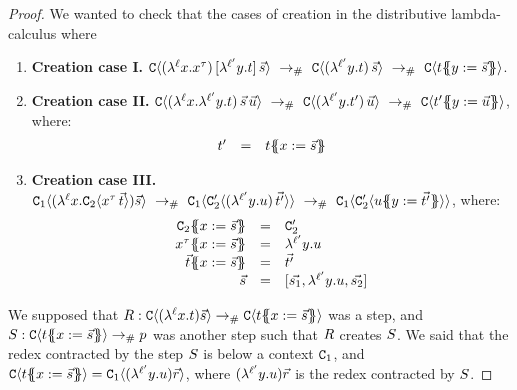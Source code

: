 
\begin{proof}
We wanted to check that the cases of creation in the distributive lambda-calculus where
\begin{enumerate}
\item {\bf Creation case I.}
  $
    \con\of{ (\lamp{\lab}{\var}{\var^{\typ}})\,[\lamp{\labtwo}{\vartwo}{\tm}]\, \ls{\tmtwo}}
    \ \todist\ %
    \con\of{ (\lamp{\labtwo}{\vartwo}{\tm})\,\ls{\tmtwo} }
    \ \todist\ %
    \con\of{ \tm\sub{\vartwo}{\ls{\tmtwo}} }
  $.
\item {\bf Creation case II.}
  $
     \con\of{ (\lamp{\lab}{\var}{ \lamp{\labtwo}{\vartwo}{\tm} })\,\ls{\tmtwo}\,\ls{\tmthree} }
     \ \todist\ %
     \con\of{ (\lamp{\labtwo}{\vartwo}{\tm'})\,\ls{\tmthree} }
     \ \todist\ %
     \con\of{ \tm'\sub{\vartwo}{\ls{\tmthree}} }
  $, where:
  \[
     \begin{array}{rcl}
     t' & = & t\{\!\!\{x := \vec{s}\}\!\!\}
     \end{array}
  \]
\item {\bf Creation case III.}
  $
    \con_1\of{(\lamp{\lab}{\var}{\con_2\of{\var^{\typ}\,\ls{\tm}}})\ls{\tmtwo}}
    \ \todist\ %
    \con_1\of{\con'_2\of{(\lamp{\labtwo}{\vartwo}{\tmthree})\,\ls{\tm'}}}
    \ \todist\ %
    \con_1\of{\con'_2\of{\tmthree\sub{\vartwo}{\ls{\tm'}}}}
  $,
  where:
  \[
  \begin{array}{rcl}
    \con_2\sub{\var}{\ls{\tmtwo}}      & = & \con'_2 \\
    \var^{\typ}\sub{\var}{\ls{\tmtwo}} & = & \lamp{\labtwo}{\vartwo}{\tmthree} \\
    \ls{\tm}\sub{\var}{\ls{\tmtwo}}    & = & \ls{\tm'} \\
    \ls{\tmtwo}                        & = & [\ls{\tmtwo_1},\lamp{\labtwo}{\vartwo}{\tmthree},\ls{\tmtwo_2}] \\
  \end{array}
  \]
\end{enumerate}

We supposed that $R : \mathtt{C}\langle(\lambda^{\ell} x. t)\vec{s}\rangle \mathrel{\to_{\mathtt{\#}}} \mathtt{C}\langle t\{\!\!\{x := \vec{s}\}\!\!\}\rangle$ was a step,
and $S : \mathtt{C}\langle t\{\!\!\{x := \vec{s}\}\!\!\}\rangle \mathrel{\to_{\mathtt{\#}}} p$ was another step
such that $R$ creates $S$.
We said that the redex contracted by the step $S$ is below a context $\mathtt{C}_1$,
and $\mathtt{C}\langle t\{\!\!\{x := \vec{s}\}\!\!\}\rangle = \mathtt{C}_1\langle(\lambda^{\ell'} y. u)\vec{r}\rangle$,
where $(\lambda^{\ell'} y. u)\vec{r}$ is the redex contracted by $S$.



\end{proof}
